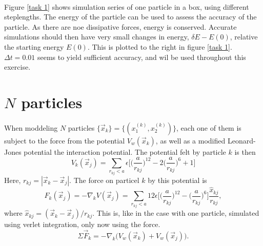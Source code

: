 \documentclass{article}
\begin{document}
        \paragraph*{}
        Figure \ref{task 1} shows simulation series of one particle in a box, using different steplengths. The energy of the particle can be used to assess the accuracy of the particle. As there are noe dissipative forces, energy is conserved. Accurate simulations should then have very small changes in energy, $\delta E - E(0)$, relative the starting energy $E(0)$. This is plotted to the right in figure \ref{task 1}. $\Delta t = 0.01$ seems to yield sufficient accuracy, and wil be used throughout this exercise.
        

    \section*{$N$ particles}
        When moddeling $N$ particles $\{ \vec x_k\} = \{ (x_1^{(k)}, x_2^{(k)}) \}$, each one of them is subject to the force from the potential $V_w(\vec x_k)$, as well as a modified Leonard-Jones potential the interaction potential. The potential felt by particle $k$ is then
        \begin{equation*}
            V_k(\vec x_j) = 
            \sum_{r_{kj}<a}\epsilon \bigg[ \bigg( \frac{a}{r_{kj}}\bigg)^{12} - 2\bigg(\frac{a}{r_{kj}}\bigg)^{6} + 1 \bigg]
        \end{equation*}
        Here, $r_{kj} = |\vec x_k - \vec x_j|$. The force on particel $k$ by this potential is
        \begin{equation*}
            F_k (\vec x_j) = -\nabla_k V(\vec x_j) = \sum_{r_{kj}<a} 12 \epsilon \bigg[ \bigg( \frac{a}{r_{kj}}\bigg)^{12} - \bigg(\frac{a}{r_{kj}}\bigg)^{6}\bigg] \frac{\hat x_{kj}}{r_{kj}},
        \end{equation*}
        where $\hat x_{kj} = (\vec x_k - \vec x_j) / r_{kj}$. This is, like in the case with one particle, simulated using verlet integration, only now using the force.
        \begin{equation*}
            \Sigma \vec F_k = -\nabla_k \big( V_w(\vec x_k) + V_w(\vec x_j) \big).
        \end{equation*}
\end{document}
